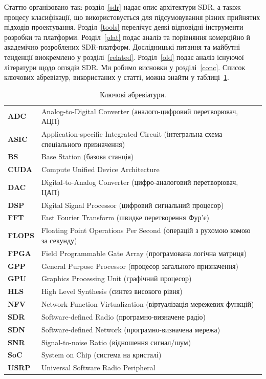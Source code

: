 \documentclass[journal]{IEEEtran}
\begin{document}
Статтю організовано так: розділ~\ref{sdr} надає опис архітектури SDR, а також процесу класифікації, що використовується для підсумовування різних прийнятих підходів проектування.
Розділ~\ref{tools} перелічує деякі відповідні інструменти розробки та платформи.
Розділ~\ref{plat} подає аналіз та порівняння комерційно й академічно розроблених SDR-платформ.
Дослідницькі питання та майбутні тенденції виокремлено у розділі~\ref{related}.
Розділ~\ref{old} подає аналіз існуючої літератури щодо оглядів SDR.
Ми робимо висновки у розділі~\ref{conc}.
Список ключових абревіатур, використаних у статті, можна знайти у таблиці~\ref{acro}.


\begin{table}[t]
\centering
\caption{Ключові абревіатури.}
\label{acro}
\footnotesize
\setlength{\tabcolsep}{4pt}
\renewcommand{\arraystretch}{1.12}
\begin{tabularx}{\textwidth}{@{}>{\bfseries}l X@{}}
\toprule
ADC   & Analog-to-Digital Converter (аналого-цифровий перетворювач, АЦП) \\
ASIC  & Application-specific Integrated Circuit (інтегральна схема спеціального призначення) \\
BS    & Base Station (базова станція) \\
CUDA  & Compute Unified Device Architecture \\
DAC   & Digital-to-Analog Converter (цифро-аналоговий перетворювач, ЦАП) \\
DSP   & Digital Signal Processor (цифровий сигнальний процесор) \\
FFT   & Fast Fourier Transform (швидке перетворення Фур'є) \\
FLOPS & Floating Point Operations Per Second (операцій з рухомою комою за секунду) \\
FPGA  & Field Programmable Gate Array (програмована логічна матриця) \\
GPP   & General Purpose Processor (процесор загального призначення) \\
GPU   & Graphics Processing Unit (графічний процесор) \\
HLS   & High Level Synthesis (синтез високого рівня) \\
NFV   & Network Function Virtualization (віртуалізація мережевих функцій) \\
SDR   & Software-defined Radio (програмно-визначене радіо) \\
SDN   & Software-defined Network (програмно-визначена мережа) \\
SNR   & Signal-to-noise Ratio (відношення сигнал/шум) \\
SoC   & System on Chip (система на кристалі) \\
USRP  & Universal Software Radio Peripheral \\\hline
\end{tabularx}
\end{table}
\end{document}
